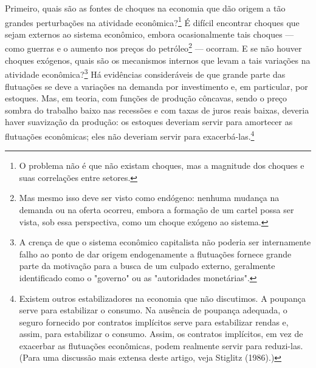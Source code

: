 \documentclass[12pt]{article}
\begin{document}
Primeiro, quais são as fontes de choques na economia que dão origem a tão grandes perturbações na atividade econômica?\footnote{O problema não é que não existam choques, mas a magnitude dos choques e suas correlações entre setores.} É difícil encontrar choques que sejam externos ao sistema econômico, embora ocasionalmente tais choques — como guerras e o aumento nos preços do petróleo\footnote{Mas mesmo isso deve ser visto como endógeno: nenhuma mudança na demanda ou na oferta ocorreu, embora a formação de um cartel possa ser vista, sob essa perspectiva, como um choque exógeno ao sistema.} — ocorram. E se não houver choques exógenos, quais são os mecanismos internos que levam a tais variações na atividade econômica?\footnote{A crença de que o sistema econômico capitalista não poderia ser internamente falho ao ponto de dar origem endogenamente a flutuações fornece grande parte da motivação para a busca de um culpado externo, geralmente identificado como o "governo" ou as "autoridades monetárias".} Há evidências consideráveis de que grande parte das flutuações se deve a variações na demanda por investimento e, em particular, por estoques. Mas, em teoria, com funções de produção côncavas, sendo o preço sombra do trabalho baixo nas recessões e com taxas de juros reais baixas, deveria haver suavização da produção: os estoques deveriam servir para amortecer as flutuações econômicas; eles não deveriam servir para exacerbá-las.\footnote{Existem outros estabilizadores na economia que não discutimos. A poupança serve para estabilizar o consumo. Na ausência de poupança adequada, o seguro fornecido por contratos implícitos serve para estabilizar rendas e, assim, para estabilizar o consumo. Assim, os contratos implícitos, em vez de exacerbar as flutuações econômicas, podem realmente servir para reduzi-las. (Para uma discussão mais extensa deste artigo, veja Stiglitz (1986).)}
\end{document}
